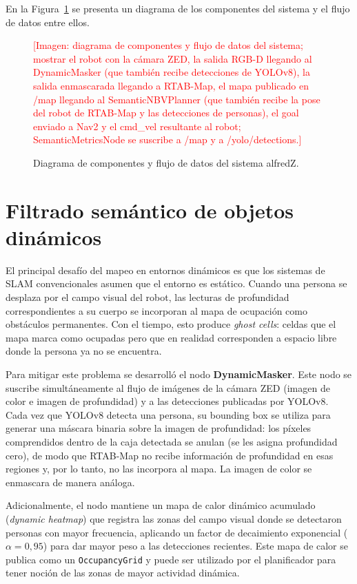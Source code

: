 En la Figura~\ref{fig:arch_overview} se presenta un diagrama de los componentes
del sistema y el flujo de datos entre ellos.

\begin{figure}[h!]
    \centering
    \textcolor{red}{%
        [Imagen: diagrama de componentes y flujo de datos del sistema; mostrar el robot
        con la cámara ZED, la salida RGB-D llegando al DynamicMasker (que
        también recibe detecciones de YOLOv8), la salida enmascarada llegando
        a RTAB-Map, el mapa publicado en /map llegando al SemanticNBVPlanner
        (que también recibe la pose del robot de RTAB-Map y las detecciones de
        personas), el goal enviado a Nav2 y el cmd\_vel resultante al robot;
        SemanticMetricsNode se suscribe a /map y a /yolo/detections.]%
    }
    \caption{Diagrama de componentes y flujo de datos del sistema alfredZ.}%
    \label{fig:arch_overview}
\end{figure}

\section{Filtrado semántico de objetos dinámicos}%
\label{sec:sol_masker}

El principal desafío del mapeo en entornos dinámicos es que los sistemas de
SLAM convencionales asumen que el entorno es estático. Cuando
una persona se desplaza por el campo visual del robot, las lecturas de
profundidad correspondientes a su cuerpo se incorporan al mapa de ocupación
como obstáculos permanentes. Con el tiempo, esto produce \textit{ghost cells}:
celdas que el mapa marca como ocupadas pero que en realidad corresponden a
espacio libre donde la persona ya no se encuentra.

Para mitigar este problema se desarrolló el nodo \textbf{DynamicMasker}. Este
nodo se suscribe simultáneamente al flujo de imágenes de la cámara ZED (imagen
de color e imagen de profundidad) y a las detecciones publicadas por YOLOv8.
Cada vez que YOLOv8 detecta una persona, su bounding box se utiliza para
generar una máscara binaria sobre la imagen de profundidad: los píxeles
comprendidos dentro de la caja detectada se anulan (se les asigna profundidad
cero), de modo que RTAB-Map no recibe información de profundidad en esas
regiones y, por lo tanto, no las incorpora al mapa. La imagen de color se
enmascara de manera análoga.

Adicionalmente, el nodo mantiene un mapa de calor dinámico acumulado
(\textit{dynamic heatmap}) que registra las zonas del campo visual donde se
detectaron personas con mayor frecuencia, aplicando un factor de decaimiento
exponencial ($\alpha = 0{,}95$) para dar mayor peso a las detecciones recientes.
Este mapa de calor se publica como un \texttt{OccupancyGrid} y puede ser
utilizado por el planificador para tener noción de las zonas de mayor actividad
dinámica.

